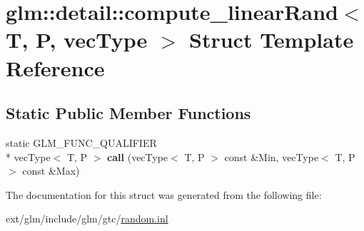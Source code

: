 \hypertarget{structglm_1_1detail_1_1compute__linear_rand}{\section{glm\-:\-:detail\-:\-:compute\-\_\-linear\-Rand$<$ T, P, vec\-Type $>$ Struct Template Reference}
\label{structglm_1_1detail_1_1compute__linear_rand}
}
\subsection*{Static Public Member Functions}
\begin{DoxyCompactItemize}
\item 
\hypertarget{structglm_1_1detail_1_1compute__linear_rand_a8eb63b699b38b830ef191d0ce323efd6}{static G\-L\-M\-\_\-\-F\-U\-N\-C\-\_\-\-Q\-U\-A\-L\-I\-F\-I\-E\-R \\*
vec\-Type$<$ T, P $>$ {\bfseries call} (vec\-Type$<$ T, P $>$ const \&Min, vec\-Type$<$ T, P $>$ const \&Max)}\label{structglm_1_1detail_1_1compute__linear_rand_a8eb63b699b38b830ef191d0ce323efd6}

\end{DoxyCompactItemize}


The documentation for this struct was generated from the following file\-:\begin{DoxyCompactItemize}
\item 
ext/glm/include/glm/gtc/\hyperlink{random_8inl}{random.\-inl}\end{DoxyCompactItemize}
